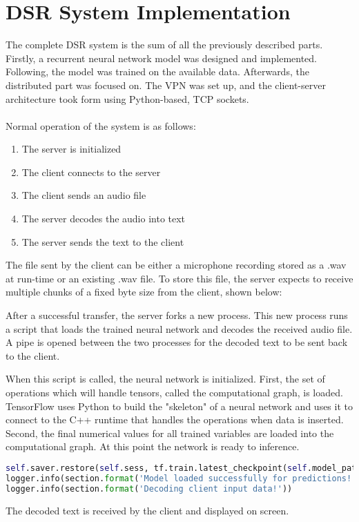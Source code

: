  
 
\section{DSR System Implementation}

The complete DSR system is the sum of all the previously described parts. Firstly, a recurrent neural network model was designed and implemented. Following, the model was trained on the available data.
Afterwards, the distributed part was focused on. The VPN was set up, and the client-server architecture took form using Python-based, TCP sockets.\\\\
Normal operation of the system is as follows:
\begin{enumerate}
\item The server is initialized
\item The client connects to the server
\item The client sends an audio file
\item The server decodes the audio into text
\item The server sends the text to the client
\end{enumerate}
The file sent by the client can be either a microphone recording stored as a .wav at run-time or an existing .wav file. To store this file, the server expects to receive multiple chunks of a fixed byte size from the client, shown below:
 
After a successful transfer, the server forks a new process. 
This new process runs a script that loads the trained neural network and decodes the received audio file. A pipe is opened between the two processes for the decoded text to be sent back to the client.

When this script is called, the neural network is initialized.
First, the set of operations which will handle tensors, called the computational graph, is loaded. 
TensorFlow uses Python to build the "skeleton" of a neural network and uses it to connect to the C++ runtime that handles the operations when data is inserted.
Second, the final numerical values for all trained variables are loaded into the computational graph. At this point the network is ready to inference.
\begin{lstlisting}[language=Python, flexiblecolumns=true, caption=Model restore.]
self.saver.restore(self.sess, tf.train.latest_checkpoint(self.model_path))
logger.info(section.format('Model loaded successfully for predictions!'))
logger.info(section.format('Decoding client input data!'))
\end{lstlisting}
The decoded text is received by the client and displayed on screen.

